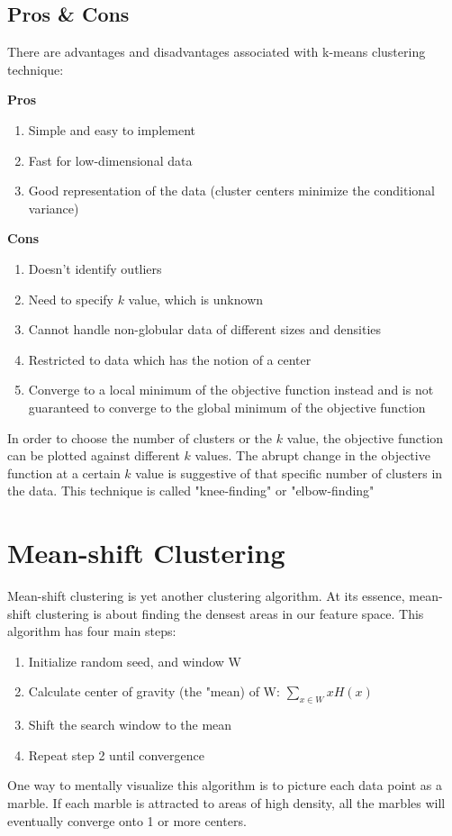 \documentclass{article}
\begin{document}
\subsection{Pros \& Cons}
There are advantages and disadvantages associated with k-means clustering technique:


\textbf{Pros}
\begin{enumerate}
\item Simple and easy to implement
\item Fast for low-dimensional data
\item Good representation of the data (cluster centers minimize the conditional variance)
\end{enumerate}
\textbf{Cons}
\begin{enumerate}
\item Doesn't identify outliers
\item Need to specify $k$ value, which is unknown 
\item Cannot handle non-globular data of different sizes and densities
\item Restricted to data which has the notion of a center 
\item Converge to a local minimum of the objective function instead and is not guaranteed to converge to the global minimum of the objective function
\end{enumerate}
In order to choose the number of clusters or the $k$ value, the objective function can be plotted against different $k$ values. The abrupt change in the objective function at a certain $k$ value is suggestive of that specific number of clusters in the data. This technique is called "knee-finding" or "elbow-finding"

\section{Mean-shift Clustering}
Mean-shift clustering is yet another clustering algorithm. At its essence, mean-shift clustering is about finding the densest areas in our feature space. This algorithm has four main steps:
\begin{enumerate}
    \item Initialize random seed, and window W
    \item Calculate center of gravity (the "mean) of W: $\displaystyle \sum_{x \in W} xH(x)$
    \item Shift the search window to the mean
    \item Repeat step 2 until convergence
\end{enumerate}
One way to mentally visualize this algorithm is to picture each data point as a marble. If each marble is attracted to areas of high density, all the marbles will eventually converge onto 1 or more centers.
\end{document}
